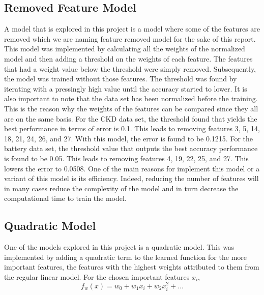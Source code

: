 \documentclass{article}
\begin{document}
\subsection{Removed Feature Model}
A model that is explored in this project is a model where some of the features are removed which we are naming feature removed model for the sake of this report. This model was implemented by calculating all the weights of the normalized model and then adding a threshold on the weights of each feature. The features that had a weight value below the threshold were simply removed.  Subsequently, the model was trained without those features. The threshold was found by iterating with a pressingly high value until the accuracy started to lower. It is also important to note that the data set has been normalized before the training. This is the reason why the weights of the features can be compared since they all are on the same basis. For the CKD data set, the threshold found that yields the best performance in terms of error is 0.1. This leads to removing features 3, 5, 14, 18, 21, 24, 26, and 27. With this model, the error is found to be 0.1215. For the battery data set, the threshold value that outputs the best accuracy performance is found to be 0.05.  This leads to removing features 4, 19, 22, 25, and 27. This lowers the error to 0.0508. One of the main reasons for implement this model or a variant of this model is its efficiency. Indeed, reducing the number of features will in many cases reduce the complexity of the model and in turn decrease the computational time to train the model. 

\subsection{Quadratic Model}

One of the models explored in this project is a quadratic model.  This was implemented by adding a quadratic term to the learned function for the more important features, the features with the highest weights attributed to them from the regular linear model.  For the chosen important features $x_i$, 
\begin{equation}
   f_w(x) = w_0 + w_1 x_i + w_2 x_i^2 + \dots
\end{equation}
\end{document}
